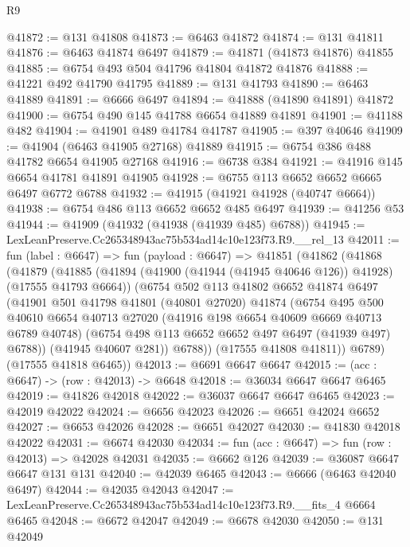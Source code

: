 \begin{lexlean}{R9}
\begin{coremodule}
@41872 := @131 @41808
@41873 := @6463 @41872
@41874 := @131 @41811
@41876 := @6463 @41874 @6497
@41879 := @41871 (@41873 @41876) @41855
@41885 := @6754 @493 @504 @41796 @41804 @41872 @41876
@41888 := @41221 @492 @41790 @41795
@41889 := @131 @41793
@41890 := @6463 @41889
@41891 := @6666 @6497
@41894 := @41888 (@41890 @41891) @41872
@41900 := @6754 @490 @145 @41788 @6654 @41889 @41891
@41901 := @41188 @482
@41904 := @41901 @489 @41784 @41787
@41905 := @397 @40646
@41909 := @41904 (@6463 @41905 @27168) @41889
@41915 := @6754 @386 @488 @41782 @6654 @41905 @27168
@41916 := @6738 @384
@41921 := @41916 @145 @6654 @41781 @41891 @41905
@41928 := @6755 @113 @6652 @6652 @6665 @6497 @6772 @6788
@41932 := @41915 (@41921 @41928 (@40747 @6664))
@41938 := @6754 @486 @113 @6652 @6652 @485 @6497
@41939 := @41256 @53
@41944 := @41909 (@41932 (@41938 (@41939 @485) @6788))
@41945 := LexLeanPreserve.Cc265348943ac75b534ad14c10e123f73.R9.__rel_13
@42011 := fun (label : @6647) =>
  fun (payload : @6647) =>
  @41851
    (@41862
      (@41868
        (@41879
          (@41885
            (@41894 (@41900 (@41944 (@41945 @40646 @126)) @41928) (@17555 @41793 @6664))
            (@6754
              @502
              @113
              @41802
              @6652
              @41874
              @6497
              (@41901
                @501
                @41798
                @41801
                (@40801 @27020)
                @41874
                (@6754
                  @495
                  @500
                  @40610
                  @6654
                  @40713
                  @27020
                  (@41916 @198 @6654 @40609 @6669 @40713 @6789 @40748)
                  (@6754 @498 @113 @6652 @6652 @497 @6497 (@41939 @497) @6788))
                (@41945 @40607 @281))
              @6788))
          (@17555 @41808 @41811))
        @6789)
      (@17555 @41818 @6465))
@42013 := @6691 @6647 @6647
@42015 := (acc : @6647) -> (row : @42013) -> @6648
@42018 := @36034 @6647 @6647 @6465
@42019 := @41826 @42018
@42022 := @36037 @6647 @6647 @6465
@42023 := @42019 @42022
@42024 := @6656 @42023
@42026 := @6651 @42024 @6652
@42027 := @6653 @42026
@42028 := @6651 @42027
@42030 := @41830 @42018 @42022
@42031 := @6674 @42030
@42034 := fun (acc : @6647) => fun (row : @42013) => @42028 @42031
@42035 := @6662 @126
@42039 := @36087 @6647 @6647 @131 @131
@42040 := @42039 @6465
@42043 := @6666 (@6463 @42040 @6497)
@42044 := @42035 @42043
@42047 := LexLeanPreserve.Cc265348943ac75b534ad14c10e123f73.R9.__fits_4 @6664 @6465
@42048 := @6672 @42047
@42049 := @6678 @42030
@42050 := @131 @42049

\end{coremodule}
\end{lexlean}
